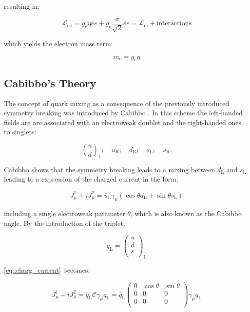 resulting in:

\begin{equation}
\mathcal{L}_{e\phi} = g_{e}\eta\bar{e}e + g_{e} \dfrac{\sigma}{\sqrt{2}}\bar{e}e = \mathcal{L}_{\text{m}} + \text{interactions}
\end{equation}

which yields the electron mass term:

\begin{equation}
m_{\text{e}} = g_{e}\eta
\end{equation}

\subsection{Cabibbo's Theory}

The concept of quark mixing as a consequence of the previously introduced symmetry breaking was introduced by Cabibbo \cite{PhysRevLett.10.531}. In this scheme the left-handed fields are are associated with an electroweak doublet and the right-handed ones to singlets:

\begin{equation}
\binom{u}{d}_{\text{L}}; \quad u_{\text{R}}; \quad d_{\text{R}}; \quad s_{\text{L}}; \quad s_{\text{R}}.
\end{equation}

Cabibbo shows that the symmetry breaking leads to a mixing between $d_{\text{L}}$ and $s_{\text{L}}$ leading to a expression of the charged current in the form:

\begin{equation}
J^{1}_{\mu} + i J^{2}_{\mu}= \bar{u}_{\text{L}}\gamma_{\mu} (\cos\theta d_{\text{L}} +\sin\theta s_{\text{L}})
\label{eq::charg_current}
\end{equation}

including a single electroweak parameter $\theta$, which is also known as the Cabibbo angle. By the introduction of the triplet:

\begin{equation}
q_{\text{L}} = 
\begin{pmatrix}
u \\
d \\
s \\
\end{pmatrix}
_{\text{L}}
\end{equation}

\autoref{eq::charg_current} becomes:

\begin{equation}
J^{1}_{\mu} + i J^{2}_{\mu} = \bar{q}_{\text{L}}\mathcal{C}\gamma_{\mu}q_{\text{L}} =  \bar{q}_{\text{L}}
\begin{pmatrix}
0 &\cos\theta &\sin\theta \\
0 &0 &0 \\
0 &0 &0\\
\end{pmatrix}
\gamma_{\mu}q_{\text{L}}
\label{eq::charg_current_matrix}
\end{equation}

